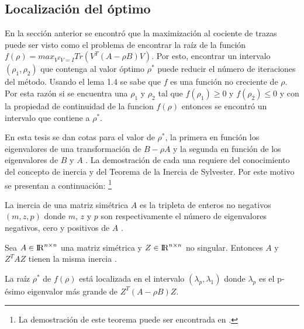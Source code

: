 \subsection{Localización del óptimo}

En la sección anterior se encontró que la maximización al cociente de trazas puede ser visto como el problema de encontrar la raíz de la función $f(\rho) = max_{V^T V= I} Tr(V^T(A-\rho B)V)$. Por esto, encontrar un intervalo $(\rho_1, \rho_2)$ que contenga al valor óptimo $\rho^*$ puede reducir el número de iteraciones del método. Usando el lema 1.4 se sabe que $f$ es una función no creciente de $\rho$. Por esta razón si se encuentra una $\rho_1$ y $\rho_2$ tal que $f(\rho_1) \geq 0$ y $f(\rho_2) \leq 0$ y con la propiedad de continuidad de la funcion $f(\rho)$ entonces se encontró un intervalo que contiene a $\rho^*$. 

En esta tesis se dan cotas para el valor de $\rho^*$, la primera en función los eigenvalores de una transformación de $B -\rho A$ y la segunda en función de los eigenvalores de $B$ y $A$ \cite{ngo2012trace}. La demostración de cada una requiere del conocimiento del concepto de inercia y del Teorema de la Inercia de Sylvester. Por este motivo se presentan a continuación: \footnote{La demostración de este teorema puede ser encontrada en \cite{golub2012matrix}.}

\begin{definition}
La inercia de una matriz simétrica $A$ es la tripleta de enteros no negativos $(m, z, p)$ donde $m$, $z$ y $p$ son respectivamente el número de eigenvalores negativos, cero y positivos de $A$ \cite{golub2012matrix}.
\end{definition}

\begin{theorem}\label{teorem.2}
Sea $A \in {\rm I\!R}^{n \times n}$ una matriz simétrica y $Z \in {\rm I\!R}^{n \times n}$ no singular. Entonces $A$ y $Z^T A Z$ tienen la misma inercia \cite{golub2012matrix}.
\end{theorem}

\begin{proposition}
La raíz $\rho^*$ de $f(\rho)$ está localizada en el intervalo $(\lambda_p, \lambda_1)$ donde $\lambda_p$ es el p-ésimo eigenvalor más grande de $Z^T(A-\rho B)Z$.
\end{proposition}

